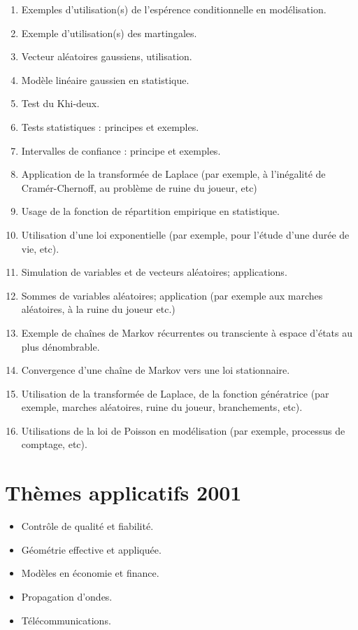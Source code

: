 {{\begin{enumerate}
  martingales).
\item \label{L-01-5} Exemples d'utilisation(s) de l'espérence conditionnelle
  en modélisation.
\item \label{L-01-6} Exemple d'utilisation(s) des martingales.
\item \label{L-01-7} Vecteur aléatoires gaussiens, utilisation.
\item \label{L-01-8} Modèle linéaire gaussien en statistique.
\item \label{L-01-9} Test du Khi-deux.
\item \label{L-01-10} Tests statistiques : principes et exemples.
\item \label{L-01-11} Intervalles de confiance : principe et exemples.
\item \label{L-01-12} Application de la transformée de Laplace (par exemple, à
  l'inégalité de Cramér-Chernoff, au problème de ruine du joueur, etc)
\item \label{L-01-13} Usage de la fonction de répartition empirique en
  statistique.
\item \label{L-01-14} Utilisation d'une loi exponentielle (par exemple, pour
  l'étude d'une durée de vie, etc).
\item \label{L-01-15} Simulation de variables et de vecteurs aléatoires;
  applications.
\item \label{L-01-16} Sommes de variables aléatoires; application (par exemple
  aux marches aléatoires, à la ruine du joueur etc.)
\item \label{L-01-17} Exemple de chaînes de Markov récurrentes ou transciente
  à espace d'états au plus dénombrable.
\item \label{L-01-18} Convergence d'une chaîne de Markov vers une loi
  stationnaire.
\item \label{L-01-19} Utilisation de la transformée de Laplace, de la fonction
  génératrice (par exemple, marches aléatoires, ruine du joueur, branchements,
  etc).
\item \label{L-01-20} Utilisations de la loi de Poisson en modélisation (par
  exemple, processus de comptage, etc).
\end{enumerate}

%
\section{Thèmes applicatifs 2001}
%

\begin{itemize}
\item Contrôle de qualité et fiabilité.
\item Géométrie effective et appliquée.
\item Modèles en économie et finance.
\item Propagation d'ondes.
\item Télécommunications.
\end{itemize}

}}
